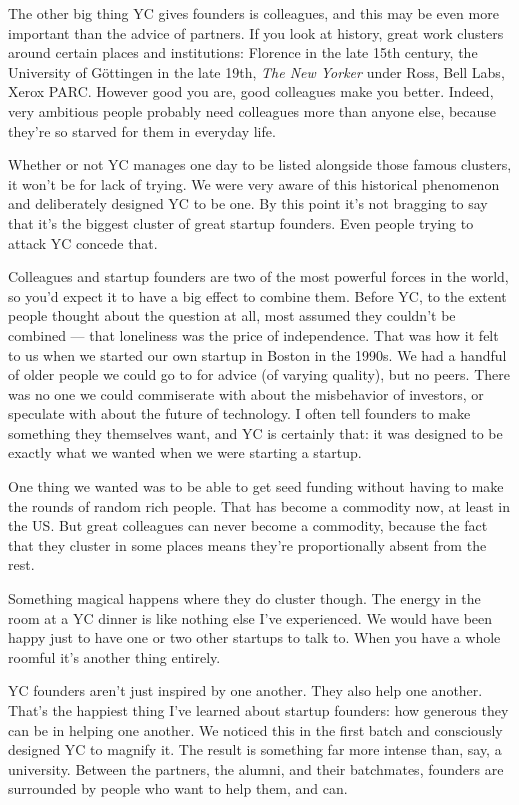 \documentclass[12pt]{book}
\begin{document}
The other big thing YC gives founders is colleagues, and this may be
even more important than the advice of partners. If you look at history,
great work clusters around certain places and institutions: Florence in
the late 15th century, the University of Göttingen in the late 19th,
\emph{The New Yorker} under Ross, Bell Labs, Xerox PARC. However good
you are, good colleagues make you better. Indeed, very ambitious people
probably need colleagues more than anyone else, because they're so
starved for them in everyday life.

Whether or not YC manages one day to be listed alongside those famous
clusters, it won't be for lack of trying. We were very aware of this
historical phenomenon and deliberately designed YC to be one. By this
point it's not bragging to say that it's the biggest cluster of great
startup founders. Even people trying to attack YC concede that.

Colleagues and startup founders are two of the most powerful forces in
the world, so you'd expect it to have a big effect to combine them.
Before YC, to the extent people thought about the question at all, most
assumed they couldn't be combined --- that loneliness was the price of
independence. That was how it felt to us when we started our own startup
in Boston in the 1990s. We had a handful of older people we could go to
for advice (of varying quality), but no peers. There was no one we could
commiserate with about the misbehavior of investors, or speculate with
about the future of technology. I often tell founders to make something
they themselves want, and YC is certainly that: it was designed to be
exactly what we wanted when we were starting a startup.

One thing we wanted was to be able to get seed funding without having to
make the rounds of random rich people. That has become a commodity now,
at least in the US. But great colleagues can never become a commodity,
because the fact that they cluster in some places means they're
proportionally absent from the rest.

Something magical happens where they do cluster though. The energy in
the room at a YC dinner is like nothing else I've experienced. We would
have been happy just to have one or two other startups to talk to. When
you have a whole roomful it's another thing entirely.

YC founders aren't just inspired by one another. They also help one
another. That's the happiest thing I've learned about startup founders:
how generous they can be in helping one another. We noticed this in the
first batch and consciously designed YC to magnify it. The result is
something far more intense than, say, a university. Between the
partners, the alumni, and their batchmates, founders are surrounded by
people who want to help them, and can.
\end{document}
